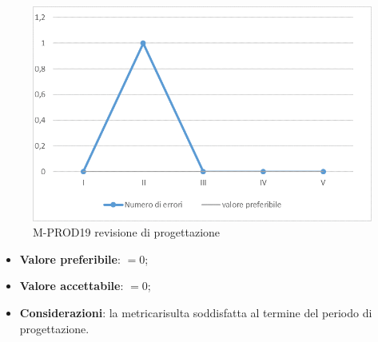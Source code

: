\begin{figure}[H] 	
	\includegraphics[width=\linewidth]{./img/grafici/RP17.png}	
	\caption{M-PROD19 revisione di progettazione\glo}	
\end{figure}
\begin{itemize}
	\item \textbf{Valore preferibile}: $=0$;
	\item \textbf{Valore accettabile}: $=0$;
	\item \textbf{Considerazioni}: la metrica\glosp risulta soddisfatta al termine del periodo di progettazione\glo.
\end{itemize}
